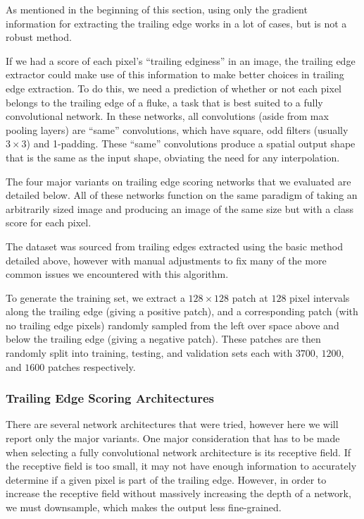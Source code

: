 As mentioned in the beginning of this section, using only the gradient information for extracting the trailing edge works in a lot of cases, but is not a robust method.

If we had a score of each pixel's ``trailing edginess'' in an image, the trailing edge extractor could make use of this information to make better choices in trailing edge extraction.
To do this, we need a prediction of whether or not each pixel belongs to the trailing edge of a fluke, a task that is best suited to a fully convolutional network.
In these networks, all convolutions (aside from max pooling layers) are ``same'' convolutions, which have square, odd filters (usually $3 \times 3$) and 1-padding. %
These ``same'' convolutions produce a spatial output shape that is the same as the input shape, obviating the need for any interpolation.

The four major variants on trailing edge scoring networks that we evaluated are detailed below.
All of these networks function on the same paradigm of taking an arbitrarily sized image and producing an image of the same size but with a class score for each pixel.

The dataset was sourced from trailing edges extracted using the basic method detailed above, however with manual adjustments to fix many of the more common issues we encountered with this algorithm.

To generate the training set, we extract a $128 \times 128$ patch at $128$ pixel intervals along the trailing edge (giving a positive patch), and a corresponding patch (with no trailing edge pixels) randomly sampled from the left over space above and below the trailing edge (giving a negative patch).
These patches are then randomly split into training, testing, and validation sets each with $3700$, $1200$, and $1600$ patches respectively.

\subsubsection{Trailing Edge Scoring Architectures}

There are several network architectures that were tried, however here we will report only the major variants.
One major consideration that has to be made when selecting a fully convolutional network architecture is its receptive field.
If the receptive field is too small, it may not have enough information to accurately determine if a given pixel is part of the trailing edge.
However, in order to increase the receptive field without massively increasing the depth of a network, we must downsample, which makes the output less fine-grained.

